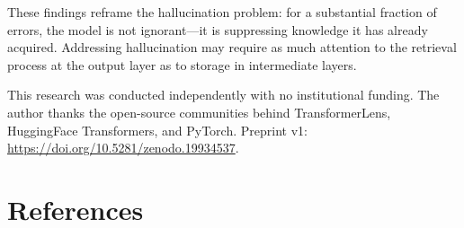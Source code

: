 \documentclass{article}
\begin{document}
These findings reframe the hallucination problem: for a substantial fraction
of errors, the model is not ignorant---it is suppressing knowledge it has
already acquired.
Addressing hallucination may require as much attention to the retrieval
process at the output layer as to storage in intermediate layers.

\begin{ack}
This research was conducted independently with no institutional funding.
The author thanks the open-source communities behind TransformerLens,
HuggingFace Transformers, and PyTorch.
Preprint v1: \url{https://doi.org/10.5281/zenodo.19934537}.
\end{ack}

\section*{References}
\end{document}
